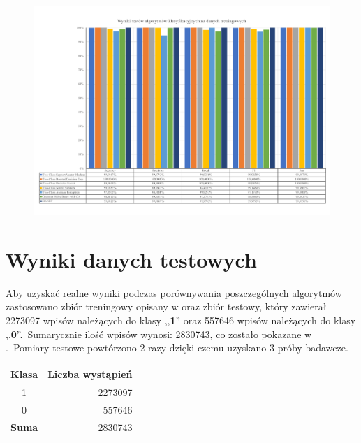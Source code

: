 \begin{landscape}
    \vspace*{\fill}
    \begin{figure}[H]
        \centering
        \includegraphics[height=0.8\textwidth]{images/predict_same}
        \label{fig:predict-same}
    \end{figure}
    \vfill
\end{landscape}


\section{Wyniki danych testowych}
Aby uzyskać realne wyniki podczas porównywania poszczególnych algorytmów zastosowano zbiór treningowy opisany w  oraz zbiór testowy, który zawierał 2273097 wpisów należących do klasy ,,\textbf{1}'' oraz 557646 wpisów należących do klasy ,,\textbf{0}''.\ Sumarycznie ilość wpisów wynosi: 2830743, co zostało pokazane w .\ Pomiary testowe powtórzono 2 razy dzięki czemu uzyskano 3 próby badawcze.

\begin{table}[H]
    \centering
    \label{tab:res-test}
    \begin{tabular}{|c|r|}
        \hline
        \textbf{Klasa} & \textbf{Liczba wystąpień} \\ \hline
        1              & 2273097                   \\ \hline
        0              & 557646                    \\ \hline
        \textbf{Suma}  & 2830743                   \\ \hline
    \end{tabular}
\end{table}

